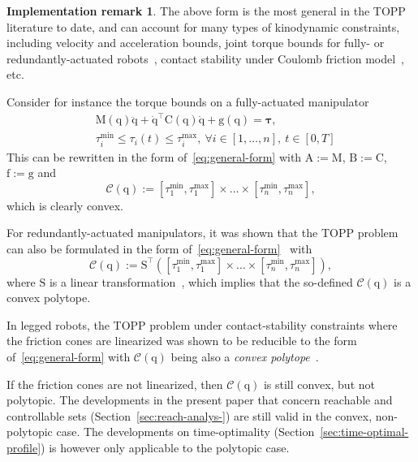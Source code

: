 \documentclass[journal]{IEEEtran}
\theoremstyle{plain}
\theoremstyle{definition}
\theoremstyle{definition}
\newtheorem{remark2}{Implementation remark}
\newenvironment{remark}
  {\renewcommand{\qedsymbol}{$\lozenge$}%
   \pushQED{\qed}\begin{remark2}}
  {\popQED\end{remark2}}
\newcommand{\bftau}{\boldsymbol{\mathbf{\tau}}}
\renewcommand{\vec}[1]{\bm{\mathrm{#1}}}  %
\newcommand{\cC}{\mathscr{C}}
\begin{document}
\begin{remark}
The above form is the most general in the TOPP literature to date,
and can account for many types of kinodynamic constraints, including
velocity and acceleration bounds, joint torque bounds for fully- or
redundantly-actuated robots~\cite{pham2015time}, contact stability
under Coulomb friction
model~\cite{hauser2014,caron2015leveraging,Caron2017}, etc.

Consider for instance the torque bounds on a fully-actuated
manipulator
\begin{align}
  \label{eq:manip}
  &\vec M(\vec q)\ddot{\vec q}+
  \dot{\vec q}^\top\vec C(\vec q)\dot{\vec q}+
  \vec g(\vec q)=\bftau, \\
  &\tau^{\min}_i \leq \tau_i(t) \leq \tau^{\max}_i, \ \forall
  i\in[1,\dots,n],\ t\in [0,T]
\end{align}
This can be rewritten in the form of~\eqref{eq:general-form} with $\vec A:= \vec
M$, $\vec B:=\vec C$, $\vec f:=\vec g$ and
\[
\cC(\vec q):= [\tau^{\min}_1,\tau^{\max}_1] \times
\dots \times [\tau^{\min}_n,\tau^{\max}_n],
\]
which is clearly convex.

For redundantly-actuated manipulators, it was shown that the TOPP
problem can also be formulated in the form
of~\eqref{eq:general-form}~\cite{pham2015time} with
\[
\cC(\vec q):= \vec S^\top \left([\tau^{\min}_1,\tau^{\max}_1] \times
\dots \times [\tau^{\min}_n,\tau^{\max}_n]\right),
\]
where $\vec S$ is a linear transformation~\cite{pham2015time}, which
implies that the so-defined $\cC(\vec q)$ is a convex polytope.

In legged robots, the TOPP problem under contact-stability constraints
where the friction cones are linearized was shown to be reducible to
the form of~\eqref{eq:general-form} with $\cC(\vec q)$ being also a
\emph{convex
  polytope}~\cite{hauser2014,pham2015time,caron2015leveraging}.

If the friction cones are not linearized, then $\cC(\vec q)$ is still
convex, but not polytopic. The developments in the present paper that
concern reachable and controllable sets
(Section~\ref{sec:reach-analys-}) are still valid in the convex,
non-polytopic case. The developments on time-optimality
(Section~\ref{sec:time-optimal-profile}) is however only applicable to
the polytopic case.
\end{remark}

\end{document}
